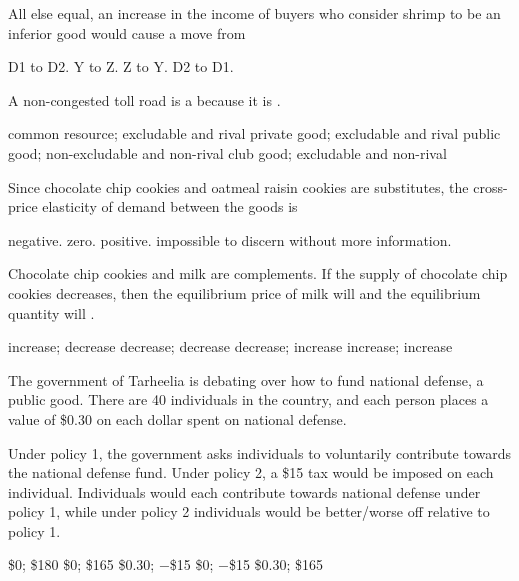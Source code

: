 \documentclass[addpoints,11pt]{exam}
\theoremstyle{definition}
\newcommand{\blank}[0]{\underline{\hspace{3cm}}}
\begin{document}
\begin{questions}
	All else equal, an increase in the income of buyers who consider shrimp to be an inferior good would cause a move from
		
		\begin{choices}
			\CorrectChoice D1 to D2.
			\choice Y to Z.
			\choice Z to Y.
			\choice D2 to D1.
		\end{choices}
		

	\question A non-congested toll road is a \blank because it is \blank.
	
	\begin{choices}
			\choice common resource; excludable and rival
			\choice private good; excludable and rival
			\choice public good; non-excludable and non-rival
			\CorrectChoice club good; excludable and non-rival
	\end{choices}


	\question Since chocolate chip cookies and oatmeal raisin cookies are substitutes, the cross-price elasticity of demand between the goods is 
	
	\begin{choices}
		\choice negative.
		\choice zero.
		\CorrectChoice positive.
		\choice impossible to discern without more information.
	\end{choices}


\newpage

\question Chocolate chip cookies and milk are complements. If the supply of chocolate chip cookies decreases, then the equilibrium price of milk will \blank and the equilibrium quantity will \blank.

\begin{choices}
	\choice increase; decrease
	\CorrectChoice decrease; decrease
	\choice decrease; increase
	\choice increase; increase
\end{choices}
	
	
\question The government of Tarheelia is debating over how to fund national defense, a public good. There are 40 individuals in the country, and each person places a value of \$0.30 on each dollar spent on national defense.

Under policy 1, the government asks individuals to voluntarily contribute towards the national defense fund. Under policy 2, a \$15 tax would be imposed on each individual. Individuals would each contribute \blank towards national defense under policy 1, while under policy 2 individuals would be \blank better/worse off relative to policy 1.

\begin{choices}
\choice \$0; \$180
\CorrectChoice \$0; \$165
\choice \$0.30; $-$\$15
\choice \$0; $-$\$15
\choice \$0.30; \$165
\end{choices}


\end{questions}
\end{document}

